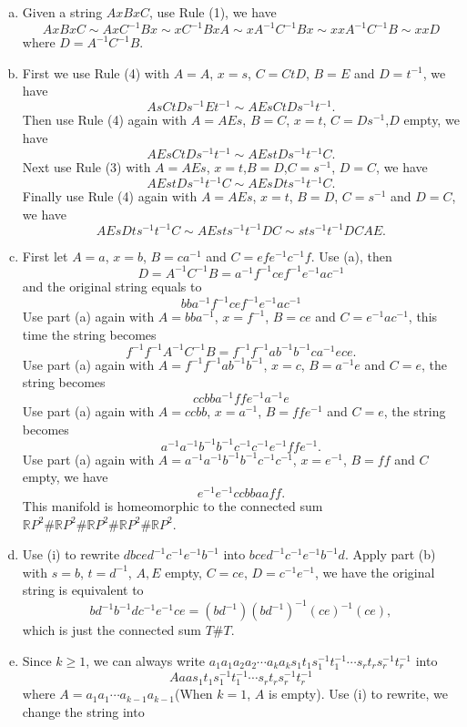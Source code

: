 \documentclass[a4paper, 12pt]{article}
\begin{document}
\begin{solution}
\begin{enumerate}[(a)]
\item Given a string \(AxBxC\), use Rule (1), we have 
\[AxBxC\sim AxC^{-1}Bx\sim xC^{-1}BxA\sim xA^{-1}C^{-1}Bx\sim xxA^{-1}C^{-1}B\sim xxD\]
where \(D=A^{-1}C^{-1}B\).
\item First we use Rule (4) with \(A=A\), \(x=s\), \(C=CtD\), \(B=E\) and \(D=t^{-1}\), we have 
\[AsCtDs^{-1}Et^{-1}\sim AEsCtDs^{-1}t^{-1}.\]
Then use Rule (4) again with \(A=AEs\), \(B=C\), \(x=t\), \(C=Ds^{-1}\),\(D\) empty, we have 
\[AEsCtDs^{-1}t^{-1}\sim AEstDs^{-1}t^{-1}C.\]
Next use Rule (3) with \(A=AEs\), \(x=t\),\(B=D\),\(C=s^{-1}\), \(D=C\), we have 
\[AEstDs^{-1}t^{-1}C\sim AEsDts^{-1}t^{-1}C.\]
Finally use Rule (4) again with \(A=AEs\), \(x=t\), \(B=D\), \(C=s^{-1}\) and \(D=C\), we have 
\[AEsDts^{-1}t^{-1}C\sim AEsts^{-1}t^{-1}DC\sim sts^{-1}t^{-1}DCAE.\]
\item First let \(A=a\), \(x=b\), \(B=ca^{-1}\) and \(C=efe^{-1}c^{-1}f\). Use (a), then 
\[D=A^{-1}C^{-1}B=a^{-1}f^{-1}cef^{-1}e^{-1}ac^{-1}\]
and the original string equals to 
\[bba^{-1}f^{-1}cef^{-1}e^{-1}ac^{-1}\]
Use part (a) again with \(A=bba^{-1}\), \(x=f^{-1}\), \(B=ce\) and \(C=e^{-1}ac^{-1}\), this time the string becomes
\[f^{-1}f^{-1}A^{-1}C^{-1}B=f^{-1}f^{-1}ab^{-1}b^{-1}ca^{-1}ece.\]
Use part (a) again with \(A=f^{-1}f^{-1}ab^{-1}b^{-1}\), \(x=c\), \(B=a^{-1}e\) and \(C=e\), the string becomes 
\[ccbba^{-1}ffe^{-1}a^{-1}e\]
Use part (a) again with \(A=ccbb\), \(x=a^{-1}\), \(B=ffe^{-1}\) and \(C=e\), the string becomes 
\[a^{-1}a^{-1}b^{-1}b^{-1}c^{-1}c^{-1}e^{-1}ffe^{-1}.\]
Use part (a) again with \(A=a^{-1}a^{-1}b^{-1}b^{-1}c^{-1}c^{-1}\), \(x=e^{-1}\), \(B=ff\) and \(C\) empty, we have 
\[e^{-1}e^{-1}ccbbaaff.\]
This manifold is homeomorphic to the connected sum \(\mathbb{R}P^2\# \mathbb{R}P^2\# \mathbb{R}P^2\# \mathbb{R}P^2\# \mathbb{R}P^2\).
\item Use (i) to rewrite \(dbced^{-1}c^{-1}e^{-1}b^{-1}\) into \(bced^{-1}c^{-1}e^{-1}b^{-1}d\). Apply part (b) with \(s=b\), \(t=d^{-1}\), \(A,E\) empty, \(C=ce\), \(D=c^{-1}e^{-1}\), 
we have the original string is equivalent to  
\[bd^{-1}b^{-1}dc^{-1}e^{-1}ce=(bd^{-1})(bd^{-1})^{-1}(ce)^{-1}(ce),\]
which is just the connected sum \(T\# T\).
\item Since \(k\geq 1\), we can always write \(a_1a_1a_2a_2\cdots a_ka_ks_1t_1s_1^{-1}t_1^{-1}\cdots s_rt_rs_r^{-1}t_r^{-1}\) into 
\[Aaas_1t_1s_1^{-1}t_1^{-1}\cdots s_rt_rs_r^{-1}t_r^{-1}\] 
where \(A=a_1a_1\cdots a_{k-1}a_{k-1}\)(When \(k=1\), \(A\) is empty). Use (i) to rewrite, we change the string into 

\end{enumerate}
\end{solution}
\end{document}
